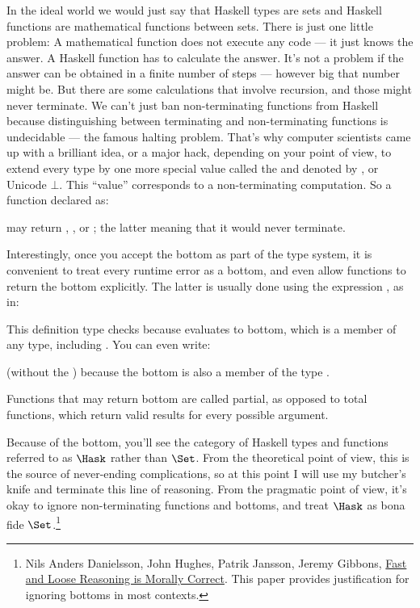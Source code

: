 In the ideal world we would just say that Haskell types are sets and
Haskell functions are mathematical functions between sets. There is just
one little problem: A mathematical function does not execute any code
--- it just knows the answer. A Haskell function has to calculate the
answer. It's not a problem if the answer can be obtained in a finite
number of steps --- however big that number might be. But there are some
calculations that involve recursion, and those might never terminate. We
can't just ban non-terminating functions from Haskell because
distinguishing between terminating and non-terminating functions is
undecidable --- the famous halting problem. That's why computer
scientists came up with a brilliant idea, or a major hack, depending on
your point of view, to extend every type by one more special value
called the  and denoted by \code{\_|\_}, or
Unicode $\bot$. This ``value'' corresponds to a non-terminating computation.
So a function declared as:

may return , , or \code{\_|\_};
the latter meaning that it would never terminate.

Interestingly, once you accept the bottom as part of the type system, it
is convenient to treat every runtime error as a bottom, and even allow
functions to return the bottom explicitly. The latter is usually done
using the expression , as in:

This definition type checks because  evaluates to
bottom, which is a member of any type, including . You can
even write:

(without the ) because the bottom is also a member of the type
.

Functions that may return bottom are called partial, as opposed to total
functions, which return valid results for every possible argument.

Because of the bottom, you'll see the category of Haskell types and
functions referred to as $\Hask$ rather than $\Set$. From
the theoretical point of view, this is the source of never-ending
complications, so at this point I will use my butcher's knife and
terminate this line of reasoning. From the pragmatic point of view, it's
okay to ignore non-terminating functions and bottoms, and treat
$\Hask$ as bona fide $\Set$.\footnote{Nils Anders Danielsson,
John Hughes, Patrik Jansson, Jeremy Gibbons, \href{http://www.cs.ox.ac.uk/jeremy.gibbons/publications/fast+loose.pdf}{
Fast and Loose Reasoning is Morally Correct}. This paper provides justification for ignoring bottoms in most contexts.}

